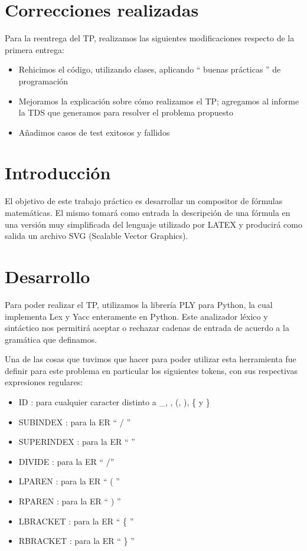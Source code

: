 \documentclass[a4paper, 10pt, twoside]{article}
\begin{document}
\newpage

\tableofcontents

\section{Correcciones realizadas}
Para la reentrega del TP, realizamos las siguientes modificaciones respecto de la primera entrega:
\begin{itemize}
  \item Rehicimos el código, utilizando clases, aplicando `` buenas prácticas '' de programación
  \item Mejoramos la explicación sobre cómo realizamos el TP; agregamos al informe la TDS que generamos para resolver el problema propuesto
  \item Añadimos casos de test exitosos y fallidos
\end{itemize}

\newpage


\section{Introducción}
El objetivo de este trabajo práctico es desarrollar un compositor de fórmulas matemáticas. El mismo tomará como entrada la descripción de una fórmula en una versión muy simplificada del lenguaje utilizado por LATEX y producirá como salida un archivo SVG (Scalable Vector Graphics).

\section{Desarrollo}
Para poder realizar el TP, utilizamos la librería PLY para Python, la cual implementa Lex y Yacc enteramente en Python. Este analizador léxico y sintáctico nos permitirá aceptar o rechazar cadenas de entrada de acuerdo a la gramática que definamos.

Una de las cosas que tuvimos que hacer para poder utilizar esta herramienta fue definir para este problema en particular los siguientes tokens, con sus respectivas expresiones regulares:
\begin{itemize}
  \item ID : para cualquier caracter distinto a \_, \detokenize{^}, (, ), \{ y \}
  \item SUBINDEX : para la ER `` / ''
  \item SUPERINDEX : para la ER `` \detokenize{^} ''
  \item DIVIDE : para la ER `` /''
  \item LPAREN : para la ER `` ( ''
  \item RPAREN : para la ER `` ) ''
  \item LBRACKET : para la ER `` \{ ''
  \item RBRACKET : para la ER `` \} ''
\end{itemize}
\end{document}
